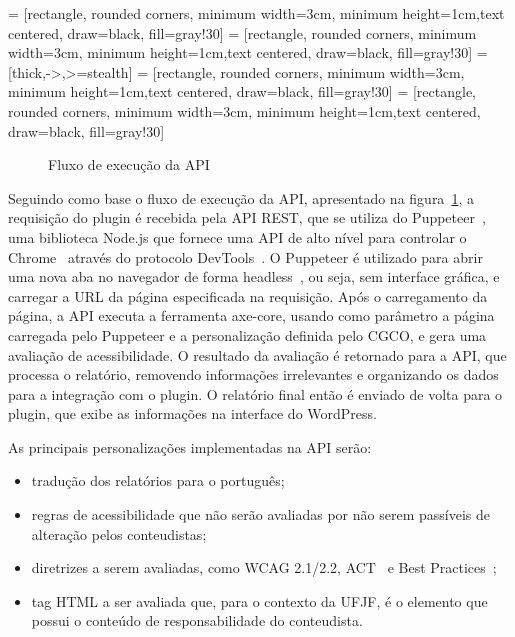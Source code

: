 \documentclass[
	article,			%
	12pt,				%
	oneside,			%
	a4paper,			%
	section=TITLE,		%
	subsection=TITLE,	%
	english,			%
	brazil,				%
	sumario=tradicional
	]{abntex2}
\begin{document}
 = [rectangle, rounded corners, minimum width=3cm,
minimum height=1cm,text centered, draw=black, fill=gray!30]
 = [rectangle, rounded corners, minimum width=3cm,
minimum height=1cm,text centered, draw=black, fill=gray!30]
 = [thick,->,>=stealth]
 = [rectangle, rounded corners, minimum width=3cm,
minimum height=1cm,text centered, draw=black, fill=gray!30]
 = [rectangle, rounded corners, minimum width=3cm,
minimum height=1cm,text centered, draw=black, fill=gray!30]
\begin{figure}[h]
    \centering
    \caption{Fluxo de execução da API}
    \label{fig:fluxo}
\end{figure}

Seguindo como base o fluxo de execução da API, apresentado na figura~\ref{fig:fluxo},
a requisição do plugin é recebida pela API REST, que se utiliza
do Puppeteer~\cite{puppeteer}, uma biblioteca Node.js que fornece uma
API de alto nível para controlar o Chrome~\cite{chrome} através do protocolo
DevTools~\cite{devtools}. O Puppeteer é utilizado para abrir uma nova aba no navegador de forma
headless~\cite{headless}, ou seja, sem interface gráfica, e carregar a URL da página
especificada na requisição. Após o carregamento da página, a API
executa a ferramenta axe-core, usando como parâmetro a página carregada
pelo Puppeteer e a personalização definida pelo CGCO, e gera uma avaliação
de acessibilidade. O resultado da avaliação é retornado para a API, que
processa o relatório, removendo informações irrelevantes e organizando os dados
para a integração com o plugin. O relatório final então é enviado de
volta para o plugin, que exibe as informações na interface do WordPress.

As principais personalizações implementadas na API serão:
\begin{itemize}
\item tradução dos relatórios para o português; 
\item regras de acessibilidade que 
não serão avaliadas por não serem passíveis de alteração pelos conteudistas;
\item diretrizes a serem avaliadas, como WCAG 2.1/2.2, ACT~\cite{ACT} e Best
Practices~\cite{BP};
\item tag HTML a ser avaliada que, para o contexto da UFJF, é o elemento que possui o conteúdo de responsabilidade do conteudista.
\end{itemize}
\end{document}

